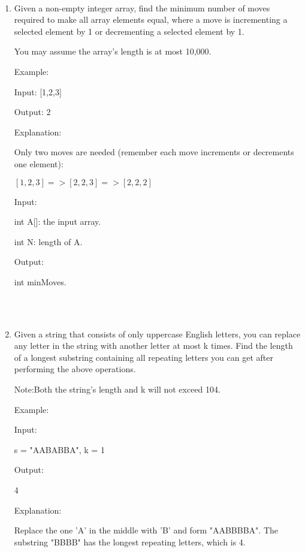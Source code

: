 \documentclass[12pt,a4paper]{article}
\begin{document}
\noindent

\noindent{}
~\\
\begin{enumerate}

\item Given a non-empty integer array, find the minimum number of moves required to make all array elements equal, where a move is incrementing a selected element by 1 or decrementing a selected element by 1.

You may assume the array's length is at most 10,000.

Example:

Input:
[1,2,3]

Output:
2

Explanation:

Only two moves are needed (remember each move increments or decrements one element):

$[1,2,3] => [2,2,3] => [2,2,2]$

Input:

int A[]: the input array.

int N: length of A.

Output:

int minMoves.


~\\
~\\


\item Given a string that consists of only uppercase English letters, you can replace any letter in the string with another letter at most k times. Find the length of a longest substring containing all repeating letters you can get after performing the above operations.

Note:Both the string's length and k will not exceed 104.

Example:

Input:

s = "AABABBA", k = 1

Output:

4

Explanation:

Replace the one 'A' in the middle with 'B' and form "AABBBBA".
The substring "BBBB" has the longest repeating letters, which is 4.


\end{enumerate}
\end{document}

